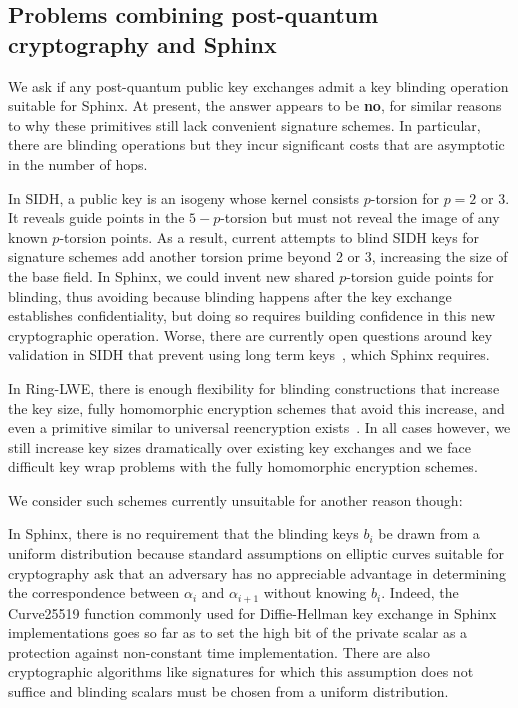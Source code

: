 \subsection{Problems combining post-quantum cryptography and Sphinx}

We ask if any post-quantum public key exchanges admit 
a key blinding operation suitable for Sphinx. 
At present, the answer appears to be {\bf no}, for similar reasons to
why these primitives still lack convenient signature schemes. 
In particular, there are blinding operations but they incur significant
costs  that are asymptotic in the number of hops.

In SIDH, a public key is an isogeny whose kernel consists $p$-torsion
for $p=2$ or $3$.  It reveals guide points in the $5-p$-torsion but
must not reveal the image of any known $p$-torsion points.  
As a result, current attempts to blind SIDH keys for signature schemes
add another torsion prime beyond 2 or 3, increasing the size of the
base field.  In Sphinx, we could invent new shared $p$-torsion guide
points for blinding, thus avoiding
because blinding happens after the key exchange
establishes confidentiality, but doing so requires building confidence
in this new cryptographic operation.  Worse, there are currently open
questions around key validation in SIDH that prevent using long term
keys~\cite{SIDH-NoValidation}, which Sphinx requires.

In Ring-LWE, there is enough flexibility for blinding constructions
that increase the key size, fully homomorphic encryption schemes that
avoid this increase, and even a primitive similar to universal
reencryption exists~\cite{963628}.  In all cases however, we still
increase key sizes dramatically over existing key exchanges and we face
difficult key wrap problems with the fully homomorphic encryption
schemes.

We consider such schemes currently unsuitable for another reason though: 

In Sphinx, there is no requirement that the blinding keys $b_i$ be
drawn from a uniform distribution because standard assumptions on
elliptic curves suitable for cryptography ask that an adversary has
no appreciable advantage in determining the correspondence between
$\alpha_i$ and $\alpha_{i+1}$ without knowing $b_i$.  
Indeed, the Curve25519 function commonly used for Diffie-Hellman key
exchange in Sphinx implementations goes so far as to set the high bit
of the private scalar as a protection against non-constant time
implementation.
There are also cryptographic algorithms like signatures for which
this assumption does not suffice and blinding scalars must be chosen
from a uniform distribution.


